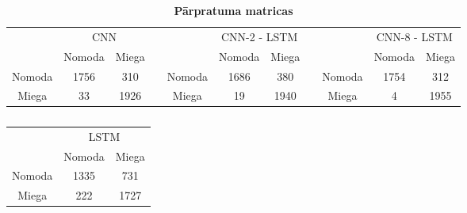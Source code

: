 \documentclass[12pt,paper=A4]{report}
\begin{document}
\begin{table}[H]
\centering
\caption{}
\captionsetup{justification=centering}
\caption*{\textbf{Pārpratuma matricas}}
\begin{tabular}{lccllccllcc}
 & \multicolumn{2}{c}{CNN} &  &  & \multicolumn{2}{c}{CNN-2 - LSTM} &  &  & \multicolumn{2}{c}{CNN-8 - LSTM} \\ \cline{2-3} \cline{6-7} \cline{10-11} 
\multicolumn{1}{l|}{} & \multicolumn{1}{c|}{Nomoda} & \multicolumn{1}{c|}{Miega} &  & \multicolumn{1}{l|}{} & \multicolumn{1}{c|}{Nomoda} & \multicolumn{1}{c|}{Miega} &  & \multicolumn{1}{l|}{} & \multicolumn{1}{c|}{Nomoda} & \multicolumn{1}{c|}{Miega} \\ \cline{1-3} \cline{5-7} \cline{9-11} 
\multicolumn{1}{|c|}{Nomoda} & \multicolumn{1}{c|}{\cellcolor[HTML]{FFFFC7}1756} & \multicolumn{1}{c|}{310} & \multicolumn{1}{l|}{} & \multicolumn{1}{c|}{Nomoda} & \multicolumn{1}{c|}{\cellcolor[HTML]{FFFFC7}1686} & \multicolumn{1}{c|}{380} & \multicolumn{1}{l|}{} & \multicolumn{1}{c|}{Nomoda} & \multicolumn{1}{c|}{\cellcolor[HTML]{FFFFC7}1754} & \multicolumn{1}{c|}{312} \\ \cline{1-3} \cline{5-7} \cline{9-11} 
\multicolumn{1}{|c|}{Miega} & \multicolumn{1}{c|}{33} & \multicolumn{1}{c|}{\cellcolor[HTML]{FFFFC7}1926} & \multicolumn{1}{l|}{} & \multicolumn{1}{c|}{Miega} & \multicolumn{1}{c|}{19} & \multicolumn{1}{c|}{\cellcolor[HTML]{FFFFC7}1940} & \multicolumn{1}{l|}{} & \multicolumn{1}{c|}{Miega} & \multicolumn{1}{c|}{4} & \multicolumn{1}{c|}{\cellcolor[HTML]{FFFFC7}1955} \\ \cline{1-3} \cline{5-7} \cline{9-11} 
\end{tabular}
\label{1000V2cl}
\end{table}

\begin{table}[H]
\centering
\caption{}
\captionsetup{justification=centering}
\begin{tabular}{lcc}
 & \multicolumn{2}{c}{LSTM} \\ \cline{2-3} 
\multicolumn{1}{l|}{} & \multicolumn{1}{c|}{Nomoda} & \multicolumn{1}{c|}{Miega} \\ \hline
\multicolumn{1}{|c|}{Nomoda} & \multicolumn{1}{c|}{\cellcolor[HTML]{FFFFC7}1335} & \multicolumn{1}{c|}{731} \\ \hline
\multicolumn{1}{|c|}{Miega} & \multicolumn{1}{c|}{222} & \multicolumn{1}{c|}{\cellcolor[HTML]{FFFFC7}1727} \\ \hline
\end{tabular}
\label{1000VV2fasd}
\end{table}
\end{document}
